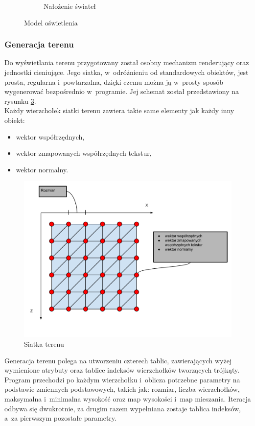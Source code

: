 \documentclass[a4paper,twoside,12pt]{book}
\begin{document}
\begin{figure}[H]
\begin{subfigure}[b]{0.5\textwidth}
        \caption{Nałożenie świateł}
        \label{fig:sum_lights}
    \end{subfigure}
    \caption{Model oświetlenia}
    \label{fig:sum_comparasion}
\end{figure}

\subsubsection{Generacja terenu}
Do wyświetlania terenu przygotowany został osobny mechanizm renderujący oraz jednostki cieniujące. Jego siatka, w~odróżnieniu od standardowych obiektów, jest prosta, regularna i~powtarzalna, dzięki czemu można ją w~prosty sposób wygenerować bezpośrednio w~programie. Jej schemat został przedstawiony na rysunku \ref{fig:terrain_grid}. \\
Każdy wierzchołek siatki terenu zawiera takie same elementy jak każdy inny obiekt:
\begin{itemize}
    \item wektor współrzędnych,
    \item wektor zmapowanych współrzędnych tekstur,
    \item wektor normalny.
\end{itemize}

\begin{figure}[H]
    \centering
    \includegraphics[width=\textwidth]{res/terrain_grid.png}
    \caption{Siatka terenu}
    \label{fig:terrain_grid}
\end{figure}

Generacja terenu polega na utworzeniu czterech tablic, zawierających wyżej wymienione atrybuty oraz tablice indeksów wierzchołków tworzących trójkąty. Program przechodzi po każdym wierzchołku i~oblicza potrzebne parametry na podstawie zmiennych podstawowych, takich jak: rozmiar, liczba wierzchołków, maksymalna i~minimalna wysokość oraz map wysokości i~map mieszania. Iteracja odbywa się dwukrotnie, za drugim razem wypełniana zostaje tablica indeksów, a~za pierwszym pozostałe parametry. %
\end{document}
